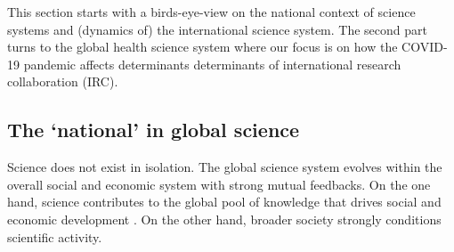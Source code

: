 This section starts with a birds-eye-view on the national context of science systems and (dynamics of) the international science system. The second part turns to the global health science system where our focus is on how the COVID-19 pandemic affects determinants determinants of international research collaboration (IRC). %

\subsection{The `national' in global science}

Science does not exist in isolation. The global science system evolves within the overall social and economic system with strong mutual feedbacks. On the one hand, science contributes to the global pool of knowledge that drives social and economic development \citep[see e.g.][]{kuznets1973modern}. On the other hand, broader society strongly conditions scientific activity. 

